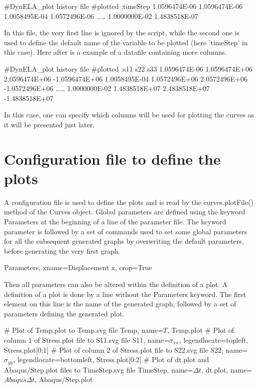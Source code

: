 \begin{PythonListing}
#DynELA_plot history file
#plotted :timeStep
1.0596474E-06 1.0596474E-06
1.0058495E-04 1.0572496E-06
\ldots\ldots
1.0000000E-02 1.4838518E-07
\end{PythonListing}

In this file, the very first line is ignored by the script, while the second one is used to define the default name of the variable to be plotted (here 'timeStep' in this case). Here after is a example of a datafile containing more columns.

\begin{PythonListing}
#DynELA_plot history file
#plotted :s11 s22 s33
1.0596474E-06 1.0596474E+06 2.0596474E+06 -1.0596474E+06
1.0058495E-04 1.0572496E+06 2.0572496E+06 -1.0572496E+06
\ldots\ldots
1.0000000E-02 1.4838518E+07 2.4838518E+07 -1.4838518E+07
\end{PythonListing}

In this case, one can specify which columns will be used for plotting the curves as it will be presented just later.

\section{Configuration file to define the plots}

A configuration file is used to define the plots and is read by the \textsf{curves.plotFile()} method of the Curves object. Global parameters are defined using the keyword \textsf{Parameters} at the beginning of a line of the parameter file. The keyword parameter is followed by a set of commands used to set some global parameters for all the subsequent generated graphs by overwriting the default parameters, before generating the very first graph.

\begin{PythonListing}
Parameters, xname=Displacement x, crop=True
\end{PythonListing}

Then all parameters can also be altered within the definition of a plot. A definition of a plot is done by a line without the \textsf{Parameters} keyword. The first element on this line is the name of the generated graph, followed by a set of parameters defining the generated plot.

\begin{PythonListing}
# Plot of Temp.plot to Temp.svg file
Temp, name=$T$, Temp.plot
# Plot of column 1 of Stress.plot file to S11.svg file
S11, name=$\sigma_{xx}$, legendlocate=topleft, Stress.plot[0:1]
# Plot of column 2 of Stress.plot file to S22.svg file
S22, name=$\sigma_{yy}$, legendlocate=bottomleft, Stress.plot[0:2]
# Plot of dt.plot and Abaqus/Step.plot files to TimeStep.svg file
TimeStep, name=$\Delta t$, dt.plot, name=$Abaqus \Delta t$, Abaqus/Step.plot
\end{PythonListing}

